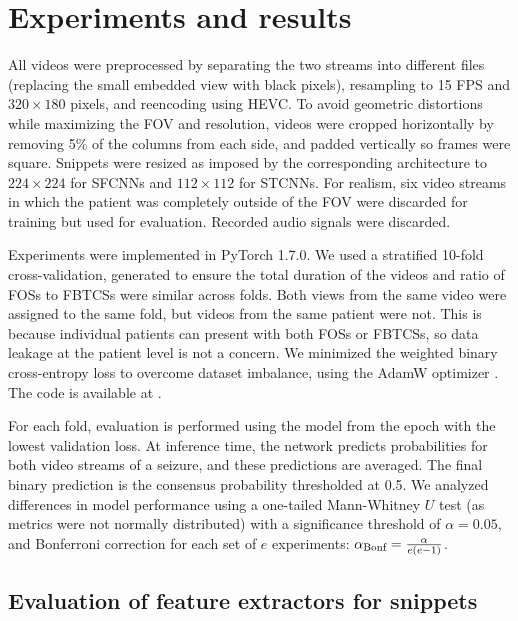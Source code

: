 \section{Experiments and results}

All videos were preprocessed by
separating the two streams into different files (replacing the small embedded view with black pixels),
resampling to 15 \ac{FPS} and $320 \times 180$ pixels,
and reencoding using \ac{HEVC}.
To avoid geometric distortions while maximizing the \ac{FOV} and resolution, videos were cropped horizontally by removing 5\% of the columns from each side, and padded vertically so frames were square.
Snippets were resized as imposed by the corresponding architecture to $224 \times 224$ for \acp{SFCNN} and  $112 \times 112$ for \acp{STCNN}.
For realism, six video streams in which the patient was completely outside of the \ac{FOV} were discarded for training but used for evaluation.
Recorded audio signals were discarded.

Experiments were implemented in PyTorch 1.7.0.
We used a stratified 10-fold cross-validation, generated to ensure the total duration of the videos and ratio of \acp{FOS} to \acp{FBTCS} were similar across folds.
Both views from the same video were assigned to the same fold, but videos from the same patient were not.
This is because individual patients can present with both \acp{FOS} or \acp{FBTCS}, so data leakage at the patient level is not a concern.
We minimized the weighted binary cross-entropy loss to overcome dataset imbalance, using the AdamW optimizer \cite{loshchilov_decoupled_2019}.
The code is available at .

For each fold, evaluation is performed using the model from the epoch with the lowest validation loss.
At inference time, the network predicts probabilities for both video streams of a seizure, and these predictions are averaged.
The final binary prediction is the consensus probability thresholded at 0.5.
We analyzed differences in model performance using a one-tailed Mann-Whitney $U$ test (as metrics were not normally distributed) with a significance threshold of $\alpha = 0.05$, and Bonferroni correction for each set of $e$ experiments: $\alpha_{\text{Bonf}} = \frac{\alpha}{e (e - 1)}$.


\subsection{Evaluation of feature extractors for snippets}
\label{sec:exp_feat}

